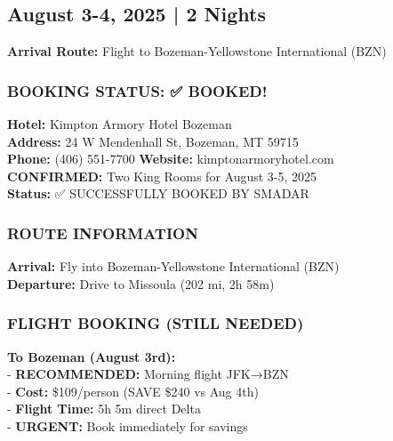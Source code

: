 \documentclass[
  11pt,
]{article}
\begin{document}
\subsection{\texorpdfstring{\textcolor{secondary}{August 3-4, 2025 | 2 Nights}}{}}\label{section-3}

\textbf{\textcolor{secondary}{Arrival Route:}} Flight to
Bozeman-Yellowstone International (BZN)

\subsubsection{\texorpdfstring{\textcolor{primary}{BOOKING STATUS: ✅ BOOKED!}}{}}\label{section-4}

\textbf{\textcolor{secondary}{Hotel:}} Kimpton Armory Hotel Bozeman\\
\textbf{\textcolor{secondary}{Address:}} 24 W Mendenhall St, Bozeman, MT
59715\\
\textbf{\textcolor{secondary}{Phone:}} (406) 551-7700 \textbar{}
\textbf{\textcolor{secondary}{Website:}} kimptonarmoryhotel.com\\
\textbf{\textcolor{primary}{CONFIRMED:}} Two King Rooms for August 3-5,
2025\\
\textbf{\textcolor{primary}{Status:}} ✅ SUCCESSFULLY BOOKED BY SMADAR

\subsubsection{\texorpdfstring{\textcolor{primary}{ROUTE INFORMATION}}{}}\label{section-5}

\textbf{\textcolor{secondary}{Arrival:}} Fly into Bozeman-Yellowstone
International (BZN)\\
\textbf{\textcolor{secondary}{Departure:}} Drive to Missoula (202 mi, 2h
58m)

\subsubsection{\texorpdfstring{\textcolor{primary}{FLIGHT BOOKING (STILL NEEDED)}}{}}\label{section-6}

\textbf{\textcolor{secondary}{To Bozeman (August 3rd):}}\\
- \textbf{RECOMMENDED:} Morning flight JFK→BZN\\
- \textbf{Cost:} \$109/person (SAVE \$240 vs Aug 4th)\\
- \textbf{Flight Time:} 5h 5m direct Delta\\
- \textbf{\textcolor{secondary}{URGENT:}} Book immediately for savings
\end{document}
